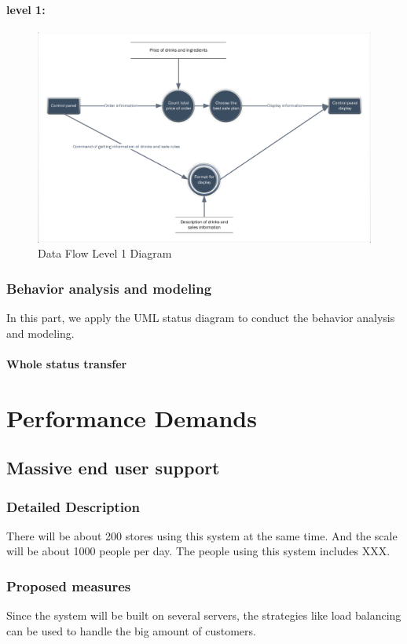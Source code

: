 \documentclass[a4paper]{report}
\begin{document}
\subsubsection{level 1:}
\begin{figure}
  \centering
  \includegraphics[scale=0.38]{DataFlowLevel1.pdf}
  \caption{Data Flow Level 1 Diagram}\label{4}
\end{figure}

\subsection{Behavior analysis and modeling}
In this part, we apply the UML status diagram to conduct the behavior analysis and modeling.
\subsubsection{Whole status transfer}

\chapter{Performance Demands}

\section{Massive end user support}
\subsection{Detailed Description}
There will be about 200 stores using this system at the same time. And the scale will be about 1000 people per day. The people using this system includes XXX.
\subsection{Proposed measures}
Since the system will be built on several servers, the strategies like load balancing can be used to handle the big amount of customers.
\end{document}
